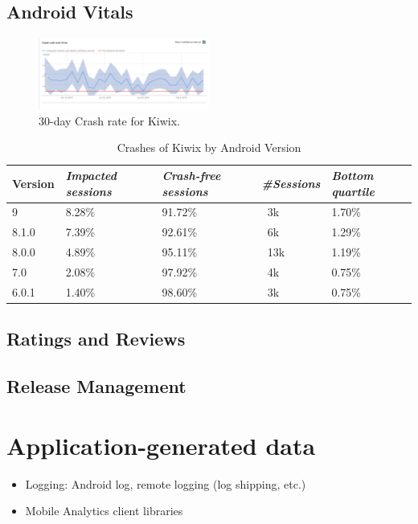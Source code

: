 \subsection{Android Vitals}


\begin{figure}[htbp]\centering
\includegraphics[width=0.5\textwidth]{images/Crash-rate-graph-for-kiwix-with-confidence-interval.png}
\caption{30-day Crash rate for Kiwix.}
\label{crashrate}
\end{figure}


\begin{table}[htbp]
\caption{Crashes of Kiwix by Android Version}

\begin{center}
\begin{tabularx}{\columnwidth}{|X|X|X|X|X|}
\hline
\textbf{Version} & \textbf{\textit{Impacted sessions}}& \textbf{\textit{Crash-free sessions}}& \textbf{\textit{\#Sessions}} & \textbf{\textit{Bottom quartile}} \\
\hline
9& 8.28\%& 91.72\%&~3k&1.70\%  \\
\hline
8.1.0&7.39\%&92.61\%&~6k&1.29\% \\
\hline
8.0.0&4.89\%&95.11\%&~13k&1.19\% \\
\hline
7.0&2.08\%&97.92\%&~4k&0.75\% \\
\hline
6.0.1&1.40\%&98.60\%&~3k&0.75\% \\
\hline
\end{tabularx}
\label{tab1}
\end{center}
\end{table}

\subsection{Ratings and Reviews}
\subsection{Release Management}

\section{Application-generated data}
\begin{itemize}
    \item Logging: Android log, remote logging (log shipping, etc.)
    \item Mobile Analytics client libraries
\end{itemize}

